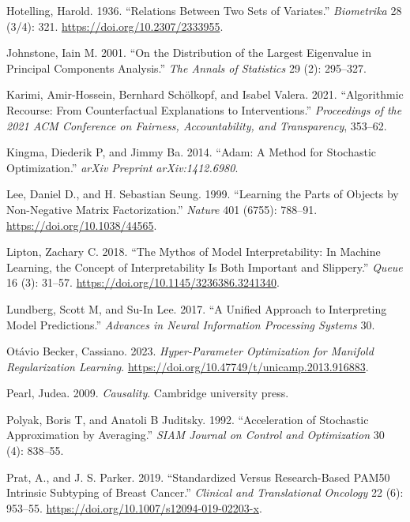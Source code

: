 \documentclass[
  letterpaper,
]{report}
\newlength{\cslhangindent}
\newenvironment{CSLReferences}[2] %
 {\begin{list}{}{%
  \setlength{\itemindent}{0pt}
  \setlength{\leftmargin}{0pt}
  \setlength{\parsep}{0pt}
  \ifodd #1
   \setlength{\leftmargin}{\cslhangindent}
   \setlength{\itemindent}{-1\cslhangindent}
  \fi
  \setlength{\itemsep}{#2\baselineskip}}}
 {\end{list}}
\begin{document}
\begin{CSLReferences}{1}{1}
Hotelling, Harold. 1936. {``Relations Between Two Sets of Variates.''}
\emph{Biometrika} 28 (3/4): 321. \url{https://doi.org/10.2307/2333955}.

Johnstone, Iain M. 2001. {``On the Distribution of the Largest
Eigenvalue in Principal Components Analysis.''} \emph{The Annals of
Statistics} 29 (2): 295--327.

Karimi, Amir-Hossein, Bernhard Schölkopf, and Isabel Valera. 2021.
{``Algorithmic Recourse: From Counterfactual Explanations to
Interventions.''} \emph{Proceedings of the 2021 ACM Conference on
Fairness, Accountability, and Transparency}, 353--62.

Kingma, Diederik P, and Jimmy Ba. 2014. {``Adam: A Method for Stochastic
Optimization.''} \emph{arXiv Preprint arXiv:1412.6980}.

Lee, Daniel D., and H. Sebastian Seung. 1999. {``Learning the Parts of
Objects by Non-Negative Matrix Factorization.''} \emph{Nature} 401
(6755): 788--91. \url{https://doi.org/10.1038/44565}.

Lipton, Zachary C. 2018. {``The Mythos of Model Interpretability: In
Machine Learning, the Concept of Interpretability Is Both Important and
Slippery.''} \emph{Queue} 16 (3): 31--57.
\url{https://doi.org/10.1145/3236386.3241340}.

Lundberg, Scott M, and Su-In Lee. 2017. {``A Unified Approach to
Interpreting Model Predictions.''} \emph{Advances in Neural Information
Processing Systems} 30.

Otávio Becker, Cassiano. 2023. \emph{Hyper-Parameter Optimization for
Manifold Regularization Learning}.
\url{https://doi.org/10.47749/t/unicamp.2013.916883}.

Pearl, Judea. 2009. \emph{Causality}. Cambridge university press.

Polyak, Boris T, and Anatoli B Juditsky. 1992. {``Acceleration of
Stochastic Approximation by Averaging.''} \emph{SIAM Journal on Control
and Optimization} 30 (4): 838--55.

Prat, A., and J. S. Parker. 2019. {``Standardized Versus Research-Based
PAM50 Intrinsic Subtyping of Breast Cancer.''} \emph{Clinical and
Translational Oncology} 22 (6): 953--55.
\url{https://doi.org/10.1007/s12094-019-02203-x}.


\end{CSLReferences}
\end{document}
